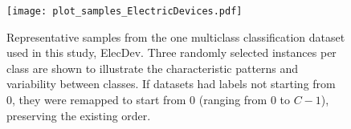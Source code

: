 \begin{figure}[!htbp]
\texttt{[image: plot\_samples\_ElectricDevices.pdf]}
\caption{Representative samples from the one multiclass classification dataset used in this study, ElecDev. Three randomly selected instances per class are shown to illustrate the characteristic patterns and variability between classes. If datasets had labels not starting from 0, they were remapped to start from 0 (ranging from 0 to $C-1$), preserving the existing order.}\label{fig:samples_multiclass}
\end{figure}